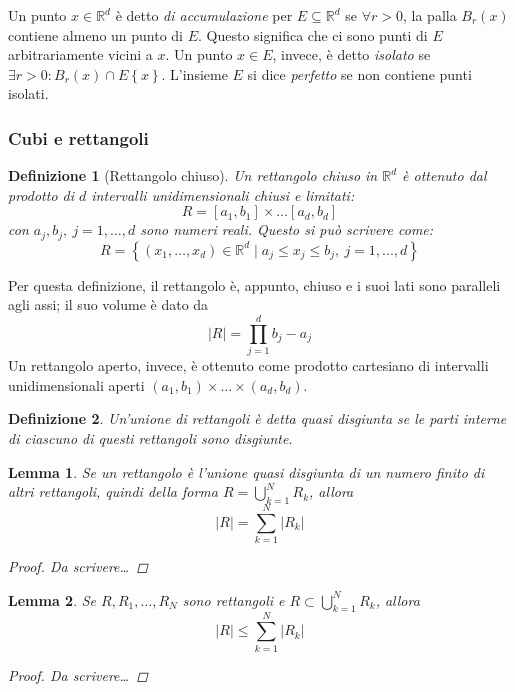 \documentclass[12pt]{article}
\theoremstyle{style}
\newtheorem{definizione}{Definizione}[section]
\newtheorem{lemma}{Lemma}[teorema]
\numberwithin{equation}{subsection}
\begin{document}
	Un punto $x \in \mathbb{R}^d$ \`e detto \textit{di accumulazione} per $E \subseteq \mathbb{R}^d$ se $\forall r > 0$, la palla $B_r(x)$ contiene almeno un punto di $E$.
	Questo significa che ci sono punti di $E$ arbitrariamente vicini a $x$.
Un punto $x \in E$, invece, \`e detto \textit{isolato} se $\exists r > 0 : B_r(x) \cap E \left\{ x \right\} $.
L'insieme $E$ si dice \textit{perfetto} se non contiene punti isolati.
\subsubsection{Cubi e rettangoli}
\begin{definizione}
	[Rettangolo chiuso]
	Un rettangolo chiuso in $\mathbb{R}^d$ \`e ottenuto dal prodotto di $d$ intervalli unidimensionali chiusi e limitati:
	\[
		R = [a_1,b_1] \times \ldots [a_d,b_d]
	\] 
	con $a_j,b_j, \ j=1,\ldots,d$ sono numeri reali. 
	Questo si pu\`o scrivere come:
	\[
	R = \left\{ (x_1,\ldots,x_d) \in \mathbb{R}^d  \mid  a_j \le x_j \le b_j, \ j =1,...,d\right\} 
	\] 
\end{definizione}
Per questa definizione, il rettangolo \`e, appunto, chiuso e i suoi lati sono paralleli agli assi; il suo volume \`e dato da
\[
\lvert R  \rvert = \prod_{j=1} ^{d} b_j - a_j
\] 
Un rettangolo aperto, invece, \`e ottenuto come prodotto cartesiano di intervalli unidimensionali aperti $(a_1,b_1) \times  \ldots \times (a_d,b_d)$.
\begin{definizione}
	Un'unione di rettangoli \`e detta \textit{quasi disgiunta} se le parti interne di ciascuno di questi rettangoli sono disgiunte.
\end{definizione}
\begin{lemma}
	Se un rettangolo \`e l'unione quasi disgiunta di un numero finito di altri rettangoli, quindi della forma $R = \bigcup_{k=1} ^N R_k$, allora 
	\[
	\lvert R \rvert  = \sum_{k=1}^{N} \lvert R_k \rvert 
	\] 
	\begin{proof}
		\textit{Da scrivere\ldots}
	\end{proof}
\end{lemma}
\begin{lemma}
	Se $R, R_1,\ldots,R_N$ sono rettangoli e $R \subset \bigcup _{k=1} ^N R_k$, allora 
	\[
	\lvert R \rvert \le \sum_{k=1}^{N} \lvert R_k \rvert 
	\] 
	\begin{proof}
		\textit{Da scrivere\ldots}
	\end{proof}
\end{lemma}
\end{document}
